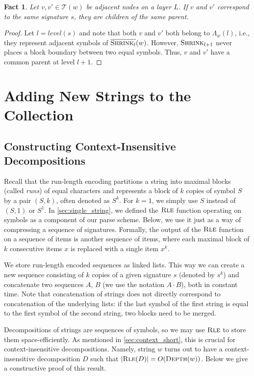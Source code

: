 \documentclass[a4paper]{article}
\newtheorem{fact}[theorem]{Fact}
\theoremstyle{remark}
\newcommand{\depth}{\textsc{Depth}}
\newcommand{\rle}{\textsc{Rle}}
\newcommand{\shrink}[1]{\ensuremath{\textsc{Shrink}_{#1}}}
\newcommand{\cshrink}[1]{\ensuremath{\overline{\textsc{Shrink}_{#1}}}}
\newcommand{\slev}{\textit{level}}
\newcommand{\stree}{\mathcal{T}}
\begin{document}
\begin{fact}\label{fct:layer}
Let $v,v'\in \stree(w)$ be adjacent nodes on a layer $L$.
If $v$ and $v'$ correspond to the same signature $s$, they are children of the same parent.
\end{fact}
\begin{proof}
  Let $l=\slev(s)$ and note that both $v$ and $v'$ both belong to $\Lambda_w(l)$,
i.e., they represent adjacent symbols of $\cshrink{l}(w)$.
However, $\shrink{l+1}$ never places a block boundary between two equal symbols.
Thus, $v$ and $v'$ have a common parent at level $l+1$.
\end{proof}

\section{Adding New Strings to the Collection}\label{sec:adding}

\subsection{Constructing Context-Insensitive Decompositions}\label{sec:constructing_cid}
Recall that the run-length encoding partitions a string into maximal blocks (called \emph{runs}) of equal characters
and represents a block of $k$ copies of symbol $S$ by a pair $(S,k)$, often denoted as $S^k$.
For $k=1$, we simply use $S$ instead of $(S,1)$ or $S^1$. 
In \cref{sec:single_string}, we defined the $\rle$ function operating on symbols as a component of our parse scheme.
Below, we use it just as a way of compressing a sequence of signatures.
Formally, the output of the $\rle$ function on a sequence of items
is another sequence of items,
where each maximal block of $k$ consecutive items $x$ is replaced with a single item $x^k$.

We store run-length encoded sequences as linked lists. This way we can create a new sequence consisting of $k$ copies
of a given signature $s$ (denoted by $s^k$) and concatenate two sequences $A$, $B$ (we use
the notation $A\cdot B$), both in constant time.
Note that concatenation of strings does not directly correspond to concatenation of the underlying lists:
if the last symbol of the first string is equal to the first symbol of the second string, two blocks need to be merged.

Decompositions of strings are sequences of symbols, so we may use $\rle$ to store them space-efficiently.
As mentioned in \cref{sec:context_short}, this is crucial for context-insensitive decompositions.
Namely, string $w$ turns out to have a context-insensitive decomposition $D$ such that $|\rle(D)|=O(\depth(w))$.
Below we give a constructive proof of this result.
\end{document}
